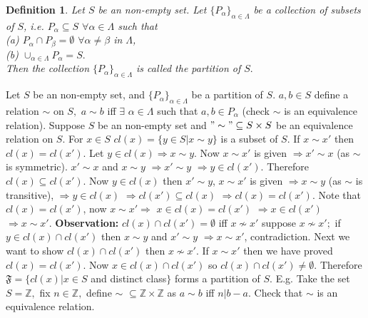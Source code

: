 \documentclass[11pt]{amsart}
\newtheorem{definition}[theorem]{Definition}%
\newcommand{\ZZ}{\mathbb Z}
\begin{document}
 \begin{definition}
Let $S$ be an non-empty set. Let $\{P_{\alpha} \}_{\alpha \in \Lambda}$ be a collection of subsets of $S$, i.e. $P_{\alpha} \subseteq S$ $\forall \alpha \in \Lambda$ such that \\
(a) $P_{\alpha} \cap P_{\beta} = \emptyset$ $\forall \alpha \neq \beta$ in $\Lambda$, \\
(b) $\cup_{\alpha \in \Lambda} P_{\alpha} = S.$\\
Then the collection  $\{P_{\alpha} \}_{\alpha \in \Lambda}$ is called the partition of $S.$
\end{definition}
Let $S$ be an non-empty set, and  $\{P_{\alpha} \}_{\alpha \in \Lambda}$ be a partition of $S.$ $a,b \in S$ define a relation $\sim$ on $S,$ $a\sim b$ iff $ \exists$ $\alpha \in \Lambda$ such that $a,b \in P_{\alpha}$ (check $\sim$ is an equivalence relation).
\newline Suppose $S$ be an non-empty set and $"\sim" \subseteq S \times S $ be an equivalence relation on $S.$ For $x \in S$ $cl(x)=\{y \in S | x \sim y \}$ is a subset of $S.$ If $x \sim x'$ then $cl(x)=cl(x').$ Let $y \in cl(x)\Rightarrow x \sim y.$ Now $x \sim x'$ is given $\Rightarrow x' \sim x$ (as $\sim$ is symmetric). $x' \sim x$ and $x \sim y$ $\Rightarrow x' \sim y$ $\Rightarrow y \in cl(x').$ Therefore $cl(x) \subseteq cl(x').$ Now $y \in cl(x)$ then $x' \sim y$, $x \sim x'$ is given $\Rightarrow x \sim y$ (as $\sim$ is transitive), $\Rightarrow y \in cl(x)$ $\Rightarrow cl(x') \subseteq cl(x)$ $\Rightarrow cl(x) = cl(x').$ Note that $cl(x)=cl(x')$, now $x \sim x' \Rightarrow$ $x \in cl(x)=cl(x')$ $\Rightarrow x \in cl(x')$ $\Rightarrow x \sim x'.$
\newline \textbf{Observation:} $cl(x) \cap cl(x') = \emptyset$ iff $x \nsim x'$
suppose $x \nsim x';$ if $y \in cl(x)\cap cl(x')$ then $x \sim y$ and $x' \sim y$ $\Rightarrow x \sim x'$, contradiction.
\newline Next we want to show $cl(x) \cap cl(x')$ then $x \nsim x'.$ If $x \sim x'$ then we have proved $cl(x) = cl(x').$ Now $x \in cl(x) \cap cl(x')$ so $cl(x) \cap cl(x') \neq \emptyset.$  Therefore $\mathfrak{F}=\{cl(x)| x \in S$ and distinct class$ \}$ forms a partition of $S.$ E.g. Take the set $S= {\ZZ},$ fix $n \in {\ZZ},$ define $\sim$  $\subseteq {\ZZ} \times {\ZZ} $ as $a \sim b$ iff $n|b-a.$ Check that $\sim$ is an equivalence relation.
\end{document}
